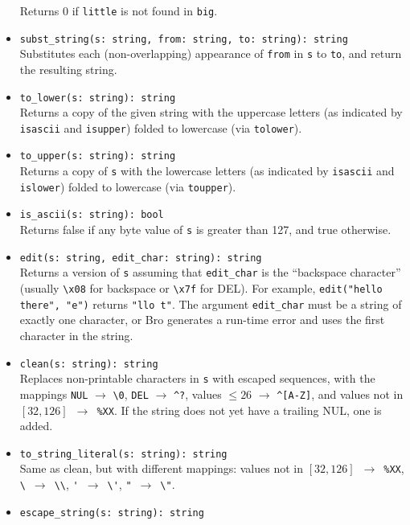 \documentclass[10pt,landscape]{article}
\begin{document}
\begin{multicols*}{2}
\begin{itemize}
    Returns 0 if \texttt{little} is not found in \texttt{big}.
  \item \verb|subst_string(s: string, from: string, to: string): string|\\
    Substitutes each (non-overlapping) appearance of \texttt{from} in
    \texttt{s} to \texttt{to}, and return the resulting string.
  \item \verb|to_lower(s: string): string|\\
    Returns a copy of the given string with the uppercase letters (as indicated
    by \verb|isascii| and \verb|isupper|) folded to lowercase (via
    \verb|tolower|).
  \item \verb|to_upper(s: string): string|\\
    Returns a copy of \verb|s| with the lowercase letters (as indicated by
    \verb|isascii| and \verb|islower|) folded to lowercase (via
    \verb|toupper|).
  \item \verb|is_ascii(s: string): bool|\\
    Returns false if any byte value of \texttt{s} is greater than 127, and true
    otherwise.
  \item \verb|edit(s: string, edit_char: string): string|\\
    Returns a version of \verb|s| assuming that \verb|edit_char| is the
    ``backspace character'' (usually \verb|\x08| for backspace or \verb|\x7f|
    for DEL). For example, \verb|edit("hello there", "e")| returns
    \verb|"llo t"|. The argument \verb|edit_char| must be a string of exactly
    one character, or Bro generates a run-time error and uses the first
    character in the string.
  \item \verb|clean(s: string): string|\\
    Replaces non-printable characters in \texttt{s} with escaped sequences,
    with the mappings
    \verb|NUL| $\rightarrow$ \verb|\0|,
    \verb|DEL| $\rightarrow$ \verb|^?|,
    values $\le 26$ $\rightarrow$ \verb|^[A-Z]|,
    and values not in $[32, 126]$~$\rightarrow$~\verb|%XX|. If the string does
    not yet have a trailing NUL, one is added.
  \item \verb|to_string_literal(s: string): string|\\
    Same as clean, but with different mappings:
    values not in $[32, 126]$~$\rightarrow$~\verb|%XX|,
    \verb|\|~$\rightarrow$~\verb|\\|,
    \verb|'|~$\rightarrow$~\verb|\'|,
    \verb|"|~$\rightarrow$~\verb|\"|.
  \item \verb|escape_string(s: string): string|\\

\end{itemize}
\end{multicols*}
\end{document}
